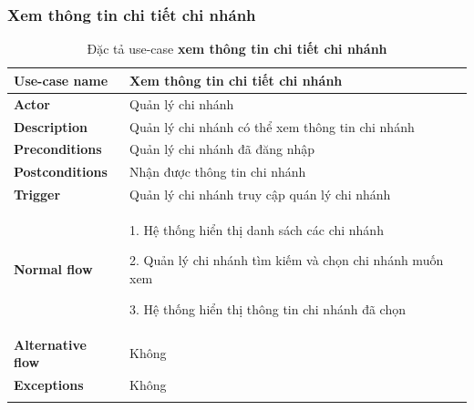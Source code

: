         \subsubsection{Xem thông tin chi tiết chi nhánh}
            \begin{longtable}{| p{} | p{} |} 
                \hline
                    \textbf{Use-case name} 
                & 
                    Xem thông tin chi tiết chi nhánh
                \\
                \hline
                    \textbf{Actor} 
                & 
                    Quản lý chi nhánh
                \\
                \hline
                    \textbf{Description} 
                & 
                    Quản lý chi nhánh có thể xem thông tin chi nhánh 
                \\
                \hline
                    \textbf{Preconditions} 
                &
                    Quản lý chi nhánh đã đăng nhập
                \\
                \hline
                    \textbf{Postconditions} 
                & 
                    Nhận được thông tin chi nhánh
                \\
                \hline
                    \textbf{Trigger} 
                & 
                    Quản lý chi nhánh truy cập quán lý chi nhánh 
                \\
                \hline
                \begin{flushleft}
                    \textbf{Normal flow}
                \end{flushleft}
                & 
                1. Hệ thống hiển thị danh sách các chi nhánh
                
                    2. Quản lý chi nhánh tìm kiếm và chọn chi nhánh muốn xem
                    
                    3. Hệ thống hiển thị thông tin chi nhánh đã chọn
                \\
                \hline
                    \textbf{Alternative flow}
                &
                    Không
                \\
                \hline
                    \textbf{Exceptions} 
                &
                    Không
                \\
                \hline
                \caption{Đặc tả use-case \textbf{xem thông tin chi tiết chi nhánh}}
            \end{longtable}
            
